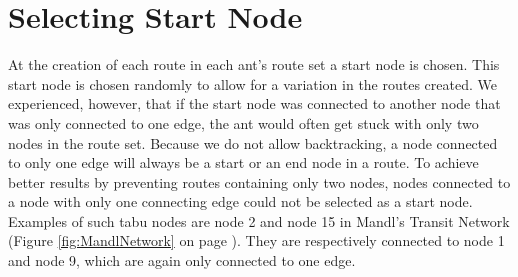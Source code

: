 \section{Selecting Start Node}

At the creation of each route in each ant's route set a start node is chosen. This start node is chosen randomly to allow for a variation in the routes created. We experienced, however, that if the start node was connected to another node that was only connected to one edge, the ant would often get stuck with only two nodes in the route set. Because we do not allow backtracking, a node connected to only one edge will always be a start or an end node in a route. To achieve better results by preventing routes containing only two nodes, nodes connected to a node with only one connecting edge could not be selected as a start node. Examples of such tabu nodes are node 2 and node 15 in Mandl's Transit Network (Figure \ref{fig:MandlNetwork} on page \pageref{fig:MandlNetwork}). They are respectively connected to node 1 and node 9, which are again only connected to one edge. 
